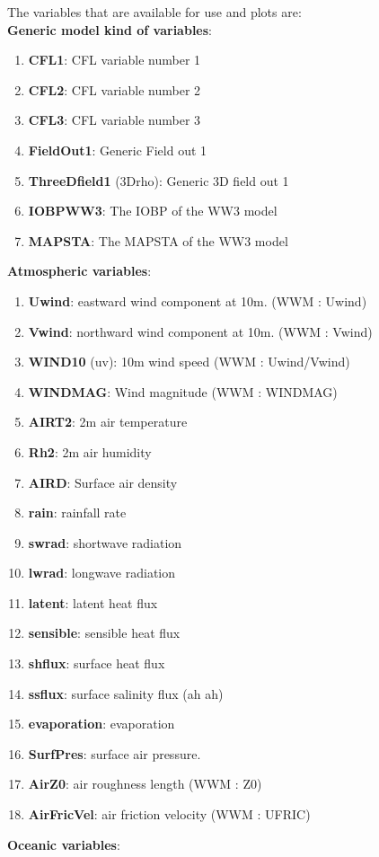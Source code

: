 \documentclass[12pt]{amsart}
\begin{document}
The variables that are available for use and plots are:\\
{\bf Generic model kind of variables}:
\begin{enumerate}
\item {\bf CFL1}: CFL variable number 1
\item {\bf CFL2}: CFL variable number 2
\item {\bf CFL3}: CFL variable number 3
\item {\bf FieldOut1}: Generic Field out 1
\item {\bf ThreeDfield1} (3Drho): Generic 3D field out 1
\item {\bf IOBPWW3}: The IOBP of the WW3 model
\item {\bf MAPSTA}: The MAPSTA of the WW3 model
\end{enumerate}
{\bf Atmospheric variables}:
\begin{enumerate}
\item {\bf Uwind}: eastward wind component at 10m. (WWM : Uwind)
\item {\bf Vwind}: northward wind component at 10m. (WWM : Vwind)
\item {\bf WIND10} (uv): 10m wind speed (WWM : Uwind/Vwind)
\item {\bf WINDMAG}: Wind magnitude (WWM : WINDMAG)
\item {\bf AIRT2}: 2m air temperature
\item {\bf Rh2}: 2m air humidity
\item {\bf AIRD}: Surface air density
\item {\bf rain}: rainfall rate
\item {\bf swrad}: shortwave radiation
\item {\bf lwrad}: longwave radiation
\item {\bf latent}: latent heat flux
\item {\bf sensible}: sensible heat flux
\item {\bf shflux}: surface heat flux
\item {\bf ssflux}: surface salinity flux (ah ah)
\item {\bf evaporation}: evaporation
\item {\bf SurfPres}: surface air pressure.
\item {\bf AirZ0}: air roughness length (WWM : Z0)
\item {\bf AirFricVel}: air friction velocity (WWM : UFRIC)
\end{enumerate}
{\bf Oceanic variables}:
\end{document}
